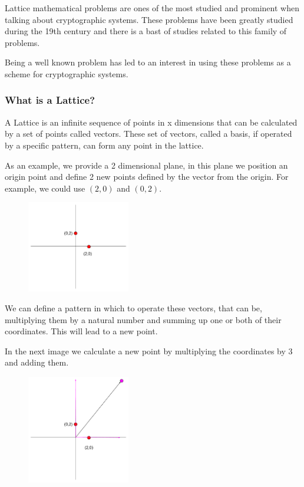 Lattice mathematical problems are ones of the most studied and prominent when
talking about cryptographic systems. These problems have been greatly studied
during the 19th century and there is a bast of studies related to this family of
problems.

Being a well known problem has led to an interest in using these problems as a
scheme for cryptographic systems.

\subsubsection{ What is a Lattice?  }

A Lattice is an infinite sequence of points in x dimensions that can be
calculated by a set of points called vectors. These set of vectors, called a
basis, if operated by a specific pattern, can form any point in the lattice.

As an example, we provide a 2 dimensional plane, in this plane we position an
origin point and define 2 new points defined by the vector from the origin. For
example, we could use $(2,0)$ and $(0,2)$.

\begin{figure}[H]
    \centering
    \includegraphics[width=0.4\textwidth]{images/lattice0}
\end{figure}

We can define a pattern in which to operate these vectors, that can be,
multiplying them by a natural number and summing up one or both of their
coordinates. This will lead to a new point.

In the next image we calculate a new point by multiplying the coordinates by 3
and adding them.

\begin{figure}[H]
    \centering
    \includegraphics[width=0.4\textwidth]{images/lattice1}
\end{figure}

